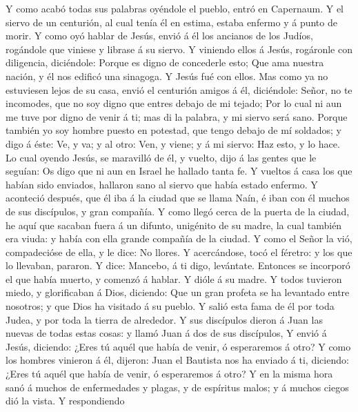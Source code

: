  Y como acabó todas sus palabras oyéndole el pueblo, entró
en Capernaum.  Y el siervo de un centurión, al cual tenía él
en estima, estaba enfermo y á punto de morir.  Y como oyó
hablar de Jesús, envió á él los ancianos de los Judíos, rogándole que
viniese y librase á su siervo.  Y viniendo ellos á Jesús,
rogáronle con diligencia, diciéndole: Porque es digno de concederle
esto;  Que ama nuestra nación, y él nos edificó una
sinagoga.  Y Jesús fué con ellos. Mas como ya no estuviesen
lejos de su casa, envió el centurión amigos á él, diciéndole: Señor, no
te incomodes, que no soy digno que entres debajo de mi tejado;
 Por lo cual ni aun me tuve por digno de venir á ti; mas di
la palabra, y mi siervo será sano.  Porque también yo soy
hombre puesto en potestad, que tengo debajo de mí soldados; y digo á
éste: Ve, y va; y al otro: Ven, y viene; y á mi siervo: Haz esto, y lo
hace.  Lo cual oyendo Jesús, se maravilló de él, y vuelto,
dijo á las gentes que le seguían: Os digo que ni aun en Israel he
hallado tanta fe.  Y vueltos á casa los que habían sido
enviados, hallaron sano al siervo que había estado enfermo.
 Y aconteció después, que él iba á la ciudad que se llama
Naín, é iban con él muchos de sus discípulos, y gran compañía.
 Y como llegó cerca de la puerta de la ciudad, he aquí que
sacaban fuera á un difunto, unigénito de su madre, la cual también era
viuda: y había con ella grande compañía de la ciudad.  Y
como el Señor la vió, compadecióse de ella, y le dice: No llores.
 Y acercándose, tocó el féretro: y los que lo llevaban,
pararon. Y dice: Mancebo, á ti digo, levántate.  Entonces
se incorporó el que había muerto, y comenzó á hablar. Y dióle á su
madre.  Y todos tuvieron miedo, y glorificaban á Dios,
diciendo: Que un gran profeta se ha levantado entre nosotros; y que Dios
ha visitado á su pueblo.  Y salió esta fama de él por toda
Judea, y por toda la tierra de alrededor.  Y sus discípulos
dieron á Juan las nuevas de todas estas cosas: y llamó Juan á dos de sus
discípulos,  Y envió á Jesús, diciendo: ¿Eres tú aquél que
había de venir, ó esperaremos á otro?  Y como los hombres
vinieron á él, dijeron: Juan el Bautista nos ha enviado á ti, diciendo:
¿Eres tú aquél que había de venir, ó esperaremos á otro?  Y
en la misma hora sanó á muchos de enfermedades y plagas, y de espíritus
malos; y á muchos ciegos dió la vista.  Y respondiendo
